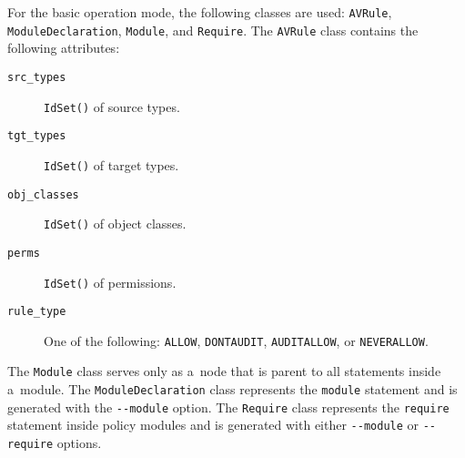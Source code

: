 For the basic operation mode, the following classes are used: \texttt{AVRule},
\texttt{ModuleDeclaration}, \texttt{Module}, and \texttt{Require}. The
\texttt{AVRule} class contains the following attributes:
\begin{description}
    \item [\texttt{src\_types}] \texttt{IdSet()} of source types.
    \item [\texttt{tgt\_types}] \texttt{IdSet()} of target types.
    \item [\texttt{obj\_classes}] \texttt{IdSet()} of object classes.
    \item [\texttt{perms}] \texttt{IdSet()} of permissions.
    \item [\texttt{rule\_type}] One of the following: \texttt{ALLOW},
        \texttt{DONTAUDIT}, \texttt{AUDITALLOW}, or \texttt{NEVERALLOW}.
\end{description}
The \texttt{Module} class serves only as a~node that is parent to all statements
inside a~module. The \texttt{ModuleDeclaration} class represents the
\texttt{module} statement and is generated with the \texttt{-{}-module} option.
The \texttt{Require} class represents the \texttt{require} statement inside
policy modules and is generated with either \texttt{-{}-module} or
\texttt{-{}-require} options.


